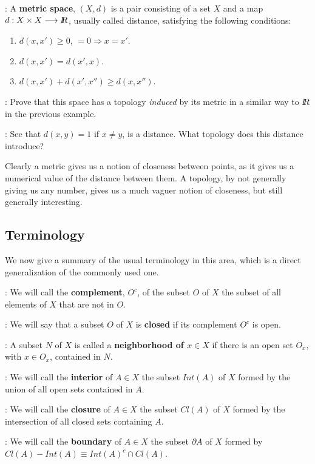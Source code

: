 : A {\bf metric space}, $(X,d)$ is a pair consisting of a set $X$ and a map $d: X \times X \longrightarrow \mbox{\sl {l$\!\!\!\;\:\!$R}}$, usually called distance, satisfying the following conditions:

\begin{enumerate} \item $d(x,x') \geq 0$, $= 0 \Rightarrow x = x'$. \item $d(x,x')=d(x',x)$. \item $d(x,x') +d(x',x'') \geq d(x,x'')$. \end{enumerate}

\ejer: Prove that this space has a topology {\it induced} by its metric in a similar way to $\mbox{\sl {l$\!\!\!\;\:\!$R}}$ in the previous example.

\ejer: See that $d(x,y)=1$ if $x\neq y$, is a distance. What topology does this distance introduce?

Clearly a metric gives us a notion of closeness between points, as it gives us a numerical value of the distance between them. A topology, by not generally giving us any number, gives us a much vaguer notion of closeness, but still generally interesting.

\subsection{Terminology}

We now give a summary of the usual terminology in this area, which is a direct generalization of the commonly used one.

: We will call the {\bf complement}, $O^c$, of the subset $O$ of $X$ the subset of all elements of $X$ that are not in $O$.

: We will say that a subset $O$ of $X$ is {\bf closed} if its complement $O^c$ is open.

: A subset $N$ of $X$ is called a {\bf neighborhood of $x \in X$} if there is an open set $O_x$, with $x \in O_x$, contained in $N$.

: We will call the {\bf interior} of $A \in X$ the subset $Int(A)$ of $X$ formed by the union of all open sets contained in $A$.

: We will call the {\bf closure} of $A \in X$ the subset $Cl(A)$ of $X$ formed by the intersection of all closed sets containing $A$.

: We will call the {\bf boundary} of $A \in X$ the subset $\partial A$ of $X$ formed by $Cl(A) - Int(A) \equiv Int(A)^c \cap Cl(A)$.

